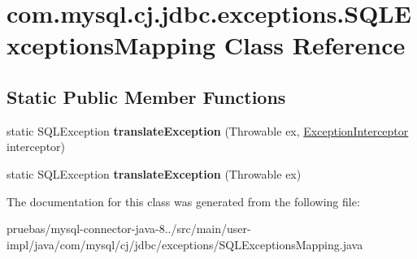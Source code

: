 \hypertarget{classcom_1_1mysql_1_1cj_1_1jdbc_1_1exceptions_1_1_s_q_l_exceptions_mapping}{}\section{com.\+mysql.\+cj.\+jdbc.\+exceptions.\+S\+Q\+L\+Exceptions\+Mapping Class Reference}
\label{classcom_1_1mysql_1_1cj_1_1jdbc_1_1exceptions_1_1_s_q_l_exceptions_mapping}
\subsection*{Static Public Member Functions}
\begin{DoxyCompactItemize}
\item 
\mbox{\label{classcom_1_1mysql_1_1cj_1_1jdbc_1_1exceptions_1_1_s_q_l_exceptions_mapping_a65c84da3d2ddfcbb8c22ce4c86ff1dc3}} 
static S\+Q\+L\+Exception {\bfseries translate\+Exception} (Throwable ex, \mbox{\hyperlink{interfacecom_1_1mysql_1_1cj_1_1exceptions_1_1_exception_interceptor}{Exception\+Interceptor}} interceptor)
\item 
\mbox{\label{classcom_1_1mysql_1_1cj_1_1jdbc_1_1exceptions_1_1_s_q_l_exceptions_mapping_ac678ac3e495c6fd3cc53982eb2afb138}} 
static S\+Q\+L\+Exception {\bfseries translate\+Exception} (Throwable ex)
\end{DoxyCompactItemize}


The documentation for this class was generated from the following file\+:\begin{DoxyCompactItemize}
\item 
pruebas/mysql-\/connector-\/java-\/8../src/main/user-\/impl/java/com/mysql/cj/jdbc/exceptions/S\+Q\+L\+Exceptions\+Mapping.\+java\end{DoxyCompactItemize}
